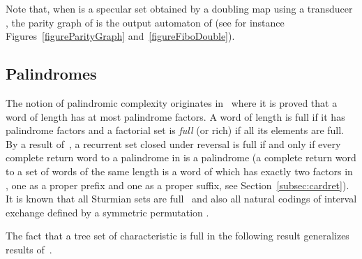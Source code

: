 \documentclass[preprint,12pt]{elsarticle}
\numberwithin{theorem}{section}
\numberwithin{equation}{section}
\numberwithin{figure}{section}
\numberwithin{table}{section}
\begin{document}
Note that, when  is a specular set obtained by a doubling map using a transducer , the parity graph of  is the output automaton of  (see for instance Figures~\ref{figureParityGraph} and~\ref{figureFiboDouble}).



\subsection{Palindromes}
\label{sec:palindromes}

The notion of palindromic complexity originates in~\cite{DroubayJustinPirillo2001} where it is proved that a word of length  has at most  palindrome factors.
A word of length  is full if it has  palindrome factors and a factorial set is \emph{full} (or rich) if all its elements are full.
By a result of~\cite{GlenJustinWidmerZamboni2009}, a recurrent set closed under reversal is full if and only if every complete return word to a palindrome in  is a palindrome (a complete return word to a set  of words of the same length is a word of  which has exactly two factors in , one as a proper prefix and one as a proper suffix, see Section~\ref{subsec:cardret}).
It is known that all Sturmian sets are full~\cite{DroubayJustinPirillo2001} and also all natural codings of interval exchange defined by a symmetric permutation \cite{BalaziMaskovaPelantova2007}.

The fact that a tree set of characteristic  is full in the following result generalizes results of~\cite{DroubayJustinPirillo2001,BalaziMaskovaPelantova2007}.
\end{document}
